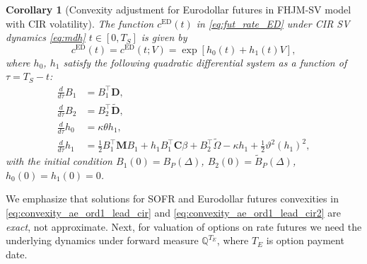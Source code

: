 \documentclass[pdftex,11pt,a4paper] {article}
\newtheorem{corollary}{Corollary}[section]
\begin{document}
\begin{corollary}[Convexity adjustment for Eurodollar futures in FHJM-SV model with CIR volatility]\label{cor:futures_conv_cir}
The function $c^{\mathrm{ED}}(t)$ in \eqref{eq:fut_rate_ED} under CIR SV dynamics \eqref{eq:mdh} $t\in[0, T_S]$ is given by
\begin{equation}\label{eq:convexity_ae_ord1_lead_cir2}
c^{\mathrm{ED}}(t)=c^{\mathrm{ED}}(t;V)=\exp\left[h_0(t)+h_1(t)V\right],
\end{equation}
where $h_0$, $h_1$ satisfy the following quadratic differential system as a function of $\tau=T_S-t$:
\begin{equation}\label{eq:MF_conv_adj_ODE_cir2}
\begin{split}
\frac{d}{d\tau}B_1&=B_1^\top \mathbf{D},\\
\frac{d}{d\tau}B_2&=B_2^\top \tilde{\mathbf{D}},\\
\frac{d}{d\tau}h_0&=\kappa\theta h_1,\\
\frac{d}{d\tau}h_1&=\frac{1}{2}B_1^\top\mathbf{M}B_1+h_1B_1^\top\mathbf{C}\beta+B_2^\top\tilde{\Omega}-\kappa h_1+\frac{1}{2}\vartheta^2 (h_1)^2,
\end{split}
\end{equation}
with the initial condition $B_1(0)=B_P(\Delta)$, $B_2(0)=\tilde B_P(\Delta)$, $h_0(0)=h_1(0)=0$. 
\end{corollary}
We emphasize that solutions for SOFR and Eurodollar futures convexities in  \eqref{eq:convexity_ae_ord1_lead_cir} and \eqref{eq:convexity_ae_ord1_lead_cir2} are {\it exact}, not approximate. 
Next, for valuation of options on rate futures we need the underlying dynamics under forward measure $\mathbb{Q}^{T_E}$, where $T_E$ is option payment date. 
\end{document}
